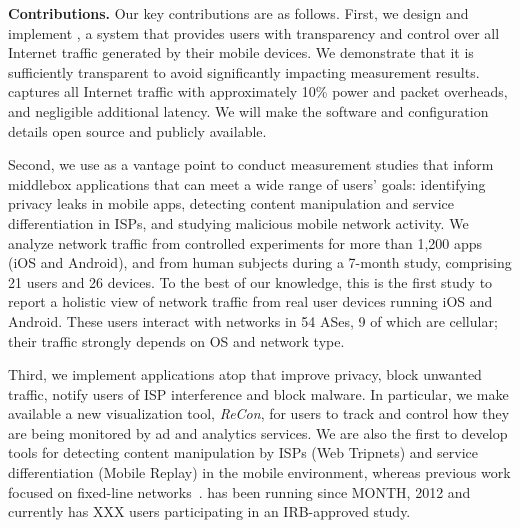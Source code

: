 \noindent\textbf{Contributions.} Our key contributions are as follows. First, we design and implement \meddle, a system that provides users with transparency 
and control %
over all Internet traffic generated by their 
mobile devices. We demonstrate that it is sufficiently transparent to avoid significantly impacting measurement results. 
\platname captures all Internet traffic with approximately 10\% power and packet overheads, and negligible additional latency. 
We will make the \platname software and configuration details open source and publicly available.

Second, we use \meddle as a vantage point to conduct measurement studies that inform 
middlebox applications that can meet a wide range of users' goals: identifying privacy leaks in mobile apps, detecting content 
manipulation and service differentiation in ISPs, and studying malicious mobile network activity. We analyze network traffic from controlled experiments for more than 1,200 apps (iOS and Android), 
and from human subjects during a 7-month study, comprising 21 users and 26 devices. To the best of our knowledge, this is the first study to report a holistic 
view of network traffic from real user devices running iOS and Android. These users interact with networks in 54 ASes, 9 of which are	 cellular; their traffic 
strongly depends on OS and network type.


Third, we implement applications atop \meddle that improve 
privacy, block unwanted traffic, notify users of ISP interference and block malware. 
In particular, we make available a new visualization tool, \emph{ReCon}, for users to track and control how 
they are being monitored by ad and analytics services. 
 We are also the first to develop tools for detecting content manipulation by ISPs (Web Tripnets) and 
 service differentiation (Mobile Replay) in the mobile environment, whereas previous work focused on 
 fixed-line networks~\cite{reis:tripwires,dischinger:glasnost}. 
\meddle has been running since 
MONTH, 2012 and currently has XXX users participating in an IRB-approved study. 







